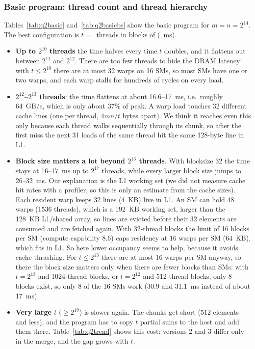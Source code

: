 \subsubsection*{Basic program: thread count and thread hierarchy}

Tables~\ref{tab:q2basic} and~\ref{tab:q2basicbs} show the basic program for
$m=n=2^{14}$. The best configuration is $t=$\,\qtwobasicbestt{} threads in blocks of
\qtwobasicbestbs{} (\qtwobasicbestms~ms).
\begin{itemize}
\item \textbf{Up to $2^{10}$ threads} the time halves every time $t$ doubles, and it
  flattens out between $2^{11}$ and $2^{12}$.
  There are too few threads to hide the DRAM latency: with $t\le 2^{10}$ there
  are at most 32 warps on 16 SMs, so most SMs have one or two warps, and each
  warp stalls for hundreds of cycles on every load.
\item \textbf{$2^{12}$--$2^{13}$ threads}: the time flattens at about 16.6--17~ms,
  i.e.\ roughly 64~GB/s, which is only about 37\% of peak. A warp load touches 32 different
  cache lines (one per thread, $4mn/t$ bytes apart). We think it reaches even
  this only because each thread walks sequentially through its chunk, so after the first
  miss the next 31 loads of the same thread hit the same 128-byte line in L1.
\item \textbf{Block size matters a lot beyond $2^{13}$ threads}. With blocksize 32 the time stays at 16--17~ms
  up to $2^{17}$ threads, while every larger block size jumps to 26--32~ms.
  Our explanation is the L1 working set (we did not measure cache hit rates
  with a profiler, so this is only an estimate from the cache sizes). Each resident warp keeps 32 lines
  (4~KB) live in L1. An SM can hold 48 warps (1536 threads), which is a 192~KB
  working set, larger than the 128~KB L1/shared array, so lines are evicted
  before their 32 elements are consumed and are fetched again. With 32-thread
  blocks the limit of 16 blocks per SM (compute capability 8.6) caps
  residency at 16 warps per SM (64~KB), which fits in L1. So here lower occupancy
  seems to help, because it avoids cache thrashing. For $t\le 2^{13}$ there are
  at most 16 warps per SM anyway, so there the block size matters only when there are
  fewer blocks than SMs: with $t=2^{13}$ and 1024-thread blocks, or $t=2^{12}$ and
  512-thread blocks, only 8 blocks exist, so only 8 of the 16 SMs work (30.9 and
  31.1~ms instead of about 17~ms).
\item \textbf{Very large $t$} ($\ge 2^{19}$) is slower again. The chunks get short
  (512 elements and less), and the program has to copy $t$ partial
  sums to the host and add them there. Table~\ref{tab:q2trend} shows this cost:
  versions 2 and 3 differ only in the merge, and the gap grows with $t$.
\end{itemize}

